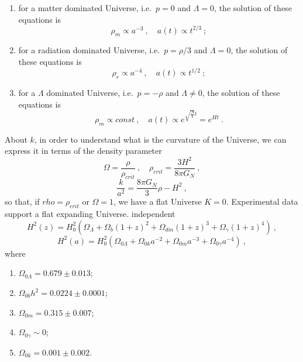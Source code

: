 \documentclass[a4paper]{article}
\begin{document}
    \begin{enumerate}
        \item for a matter dominated Universe, i.e.~$p = 0$ and $\Lambda = 0$, the solution of these equations is 
        \begin{equation*}
            \rho_m \propto a^{-3} ~, \quad  a(t) \propto t^{2 / 3} ~;
        \end{equation*}
        \item for a radiation dominated Universe, i.e.~$p = \rho / 3$ and $\Lambda = 0$, the solution of these equations is 
        \begin{equation*}
            \rho_r \propto a^{-4} ~, \quad  a(t) \propto t^{1 / 2} ~;
        \end{equation*}
        \item for a $\Lambda$ dominated Universe, i.e.~$p = - \rho$ and $\Lambda \neq 0$, the solution of these equations is 
        \begin{equation*}
            \rho_m \propto const ~, \quad  a(t) \propto e^{\sqrt{\frac{\Lambda}{3}} t} = e^{H t} ~.
        \end{equation*}
    \end{enumerate}
    About $k$, in order to understand what is the curvature of the Universe, we can express it in terms of the density parameter 
    \begin{equation*}
        \Omega = \frac{\rho}{\rho_{crit}} ~, \quad \rho_{crit} = \frac{3 H^2}{8 \pi G_N} ~,
    \end{equation*}
    \begin{equation*}
        \frac{k}{a^2} = \frac{8 \pi G_N}{3} \rho - H^2 ~,
    \end{equation*}
    so that, if $rho = \rho_{crit}$ or $\Omega = 1$, we have a flat Universe $K=0$. Experimental data support a flat expanding Universe. independent
    \begin{equation*}
        H^2(z) = H_0^2 ( \Omega_{\Lambda} + \Omega_{b} (1 + z)^2 + \Omega_{dm} (1 + z)^3 + \Omega_{\gamma} (1 + z)^4 ) ~,
    \end{equation*}
    \begin{equation*}
        H^2(a) = H_0^2 ( \Omega_{0\Lambda} + \Omega_{0k} a^{-2} + \Omega_{0m} a^{-3} + \Omega_{0\gamma} a^{-4} ) ~,
    \end{equation*}
    where
    \begin{enumerate}
        \item $\Omega_{0\Lambda} = 0.679 \pm 0.013$;
        \item $\Omega_{0b} h^2 = 0.0224 \pm 0.0001$;
        \item $\Omega_{0m} = 0.315 \pm 0.007$;
        \item $\Omega_{0\gamma} \sim 0$;
        \item $\Omega_{0k} = 0.001 \pm 0.002$.
    \end{enumerate}
\end{document}

